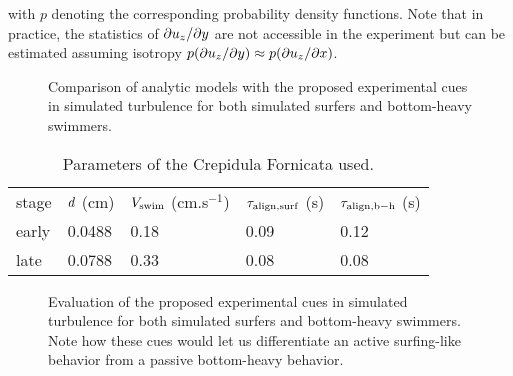 with $p$ denoting the corresponding probability density functions.
Note that in practice, the statistics of $\partial u_z / \partial y$ are not accessible in the experiment but can be estimated assuming isotropy $p(\partial u_z / \partial y) \approx p(\partial u_z / \partial x)$.
\begin{figure}
	\centering
	
	\caption[Comparison of analytic models with the proposed experimental cues in simulated turbulence.]{
		Comparison of analytic models with the proposed experimental cues in simulated turbulence for both simulated surfers and bottom-heavy swimmers.
	}
	\label{fig:experimental_cues}
\end{figure}

\begin{table}
	\center
	\begin{tabular}{w{c}{0.15\linewidth}w{c}{0.15\linewidth}w{c}{0.15\linewidth}w{c}{0.15\linewidth}w{c}{0.15\linewidth}}
		stage & $d$ (cm) & $V_{\mathrm{swim}}$ (cm.s$^{-1}$) & $\tau_{\mathrm{align}, \mathrm{surf}}$ (s) & $\tau_{\mathrm{align}, \mathrm{b-h}}$ (s) \\
		early & 0.0488 & 0.18 & 0.09 & 0.12 \\
		late & 0.0788 & 0.33 & 0.08 & 0.08 \\
	\end{tabular}
	\caption{
		Parameters of the Crepidula Fornicata used.
	}
	\label{tab:snoopy_simulation_parameters}
\end{table}

\begin{figure}
	\centering
	
	\caption[Evaluation of the proposed experimental cues in simulated turbulence.]{
		Evaluation of the proposed experimental cues in simulated turbulence for both simulated surfers and bottom-heavy swimmers.
		Note how these cues would let us differentiate an active surfing-like behavior from a passive bottom-heavy behavior.
	}
	\label{fig:experimental_cues}
\end{figure}

